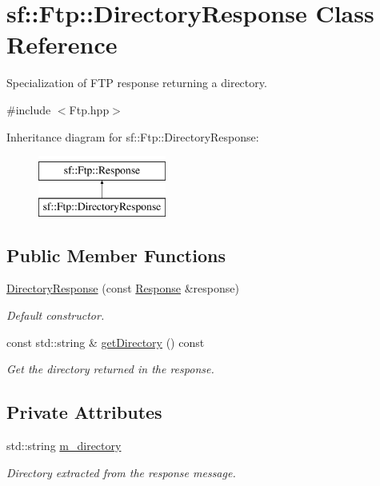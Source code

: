 \hypertarget{classsf_1_1_ftp_1_1_directory_response}{}\section{sf\+:\+:Ftp\+:\+:Directory\+Response Class Reference}
\label{classsf_1_1_ftp_1_1_directory_response}


Specialization of F\+TP response returning a directory.  




{\ttfamily \#include $<$Ftp.\+hpp$>$}

Inheritance diagram for sf\+:\+:Ftp\+:\+:Directory\+Response\+:\begin{figure}[H]
\begin{center}
\leavevmode
\includegraphics[height=2.000000cm]{classsf_1_1_ftp_1_1_directory_response}
\end{center}
\end{figure}
\subsection*{Public Member Functions}
\begin{DoxyCompactItemize}
\item 
\mbox{\hyperlink{classsf_1_1_ftp_1_1_directory_response_a36b6d2728fa53c4ad37b7a6307f4d388}{Directory\+Response}} (const \mbox{\hyperlink{classsf_1_1_ftp_1_1_response}{Response}} \&response)
\begin{DoxyCompactList}\small\item\em Default constructor. \end{DoxyCompactList}\item 
const std\+::string \& \mbox{\hyperlink{classsf_1_1_ftp_1_1_directory_response_a311575c5c50905219025acfa73de67e2}{get\+Directory}} () const
\begin{DoxyCompactList}\small\item\em Get the directory returned in the response. \end{DoxyCompactList}\end{DoxyCompactItemize}
\subsection*{Private Attributes}
\begin{DoxyCompactItemize}
\item 
\mbox{\label{classsf_1_1_ftp_1_1_directory_response_a3f782abfe5fbe7ee6c2748d3b4ae6a40}} 
std\+::string \mbox{\hyperlink{classsf_1_1_ftp_1_1_directory_response_a3f782abfe5fbe7ee6c2748d3b4ae6a40}{m\+\_\+directory}}
\begin{DoxyCompactList}\small\item\em Directory extracted from the response message. \end{DoxyCompactList}\end{DoxyCompactItemize}

